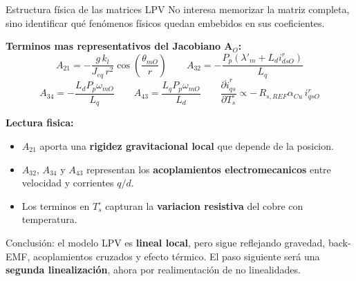 \documentclass[aspectratio=169,t]{beamer}
\begin{document}
\begin{frame}{Estructura física de las matrices LPV}
{\small\color{uncGray}No interesa memorizar la matriz completa, sino identificar qué fenómenos físicos quedan embebidos en sus coeficientes.}\par
\vspace{3mm}

\textbf{Terminos mas representativos del Jacobiano $\bm{A}_O$:}
\begin{equation*}
A_{21}=-\frac{g\,k_l}{J_{eq}\,r^2}\cos\!\left(\frac{\theta_{mO}}{r}\right)
\qquad
A_{32}=-\frac{P_p(\lambda'_m+L_d i_{dsO}^{r})}{L_q}
\end{equation*}
\begin{equation*}
A_{34}=-\frac{L_d P_p \omega_{mO}}{L_q}
\qquad
A_{43}=\frac{L_q P_p \omega_{mO}}{L_d}
\qquad
\frac{\partial \dot{i}_{qs}^{r}}{\partial T_s^\circ}\propto -\,R_{s,REF}\alpha_{Cu}\,i_{qsO}^{r}
\end{equation*}

\textbf{Lectura fisica:}
\begin{itemize}
  \item $A_{21}$ aporta una \textbf{rigidez gravitacional local} que depende de la posicion.
  \item $A_{32}$, $A_{34}$ y $A_{43}$ representan los \textbf{acoplamientos electromecanicos} entre velocidad y corrientes $q/d$.
  \item Los terminos en $T_s^\circ$ capturan la \textbf{variacion resistiva} del cobre con temperatura.
\end{itemize}

{\small Conclusión: el modelo LPV es \textbf{lineal local}, pero sigue reflejando gravedad, back-EMF, acoplamientos cruzados y efecto térmico. El paso siguiente será una \textbf{segunda linealización}, ahora por realimentación de no linealidades.}
\end{frame}
\end{document}
